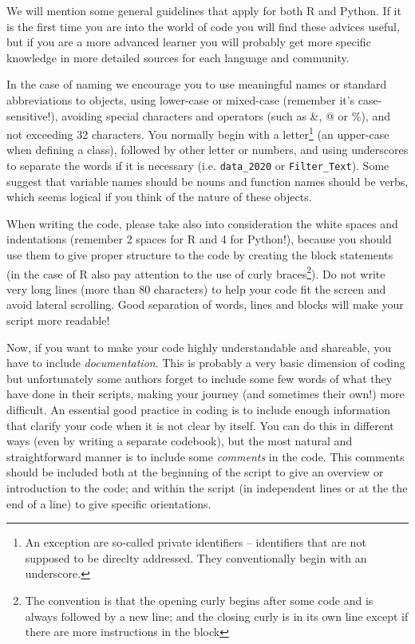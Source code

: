 We will mention some general guidelines that apply for both R and Python. If it is the first time you are into the world of code you will find these advices useful,  but if you are a more advanced learner you will probably get more specific knowledge in more detailed sources for each language and community.

In the case of naming we encourage you to use meaningful names or standard abbreviations to objects, using lower-case or mixed-case (remember it's case-sensitive!), avoiding special characters and operators (such as \&, @ or \%), and not exceeding 32 characters. You normally begin with a letter\footnote{An exception are so-called private identifiers -- identifiers that are not supposed to be direclty addressed. They conventionally begin with an underscore.} (an upper-case when defining a class), followed by other letter or numbers, and using underscores to separate the words if it is necessary (i.e. \texttt{data\_2020} or \texttt{Filter\_Text}). Some suggest that variable names should be nouns and function names should be verbs, which seems logical if you think of the nature of these objects. 

When writing the code, please take also into consideration the white spaces and indentations (remember 2 spaces for R and 4 for Python!), because you should use them to give proper structure to the code by creating the block statements (in the case of R also pay attention to the use of curly braces\footnote{The convention is that the opening curly begins after some code and is always followed by a new line; and the closing curly is in its own line except if there are more instructions in the block}). Do not write very long lines (more than 80 characters) to help your code fit the screen and avoid lateral scrolling. Good separation of words, lines and blocks will make your script more readable!

Now, if you want to make your code highly understandable and shareable, you have to include \textit{documentation}.
This is probably a very basic dimension of coding but unfortunately some authors forget to include some few words of what they have done in their scripts, making your journey (and sometimes their own!) more difficult.
An essential good practice in coding is to include enough information that clarify your code when it is not clear by itself.
You can do this in different ways (even by writing a separate codebook), but the most natural and straightforward manner is to include some  \textit{comments} in the code.
This comments should be included both at the beginning of the script to give an overview or introduction to the code;
and within the script (in independent lines or at the the end of a line) to give specific orientations.

